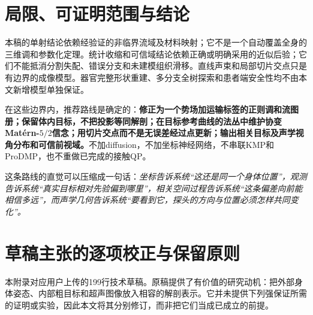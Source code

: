 \documentclass[UTF8,11pt,a4paper,fontset=fandol]{ctexart}
\numberwithin{equation}{section}
\theoremstyle{plain}
\theoremstyle{definition}
\theoremstyle{remark}
\begin{document}
\section{局限、可证明范围与结论}\label{sec:conclusion}
本稿的单射结论依赖经验证的非临界流域及材料映射；它不是一个自动覆盖全身的三维调和参数化定理。统计收缩和可信域结论依赖正确或明确采用的近似后验；它们不能抵消分割失配、错误分支和未建模组织滑移。直线声束和局部切片交点只是有边界的成像模型。器官完整形状重建、多分支全树探索和患者端安全性均不由本文新增模型单独保证。

在这些边界内，推荐路线是确定的：\textbf{修正为一个势场加运输标签的正则调和流图册；保留体内目标，不把投影等同解剖；在目标参考曲线的法丛中维护协变Mat\'ern-$5/2$信念；用切片交点而不是无误差经过点更新；输出相关目标及声学视角分布和可信前视域。}不加diffusion，不加坐标神经网络，不串联KMP和ProDMP，也不重做已完成的接触QP。

这条路线的直觉可以压缩成一句话：\emph{坐标告诉系统“这还是同一个身体位置”，观测告诉系统“真实目标相对先验偏到哪里”，相关空间过程告诉系统“这条偏差向前能相信多远”，而声学几何告诉系统“要看到它，探头的方向与位置必须怎样共同变化”。}

\clearpage
\appendix
\section{草稿主张的逐项校正与保留原则}\label{app:draft}
本附录对应用户上传的199行技术草稿\cite{UserDraft}。原稿提供了有价值的研究动机：把外部身体姿态、内部粗目标和超声图像放入相容的解剖表示。它并未提供下列强保证所需的证明或实验，因此本文将其分别修订，而非把它们当成已成立的前提。
\end{document}

